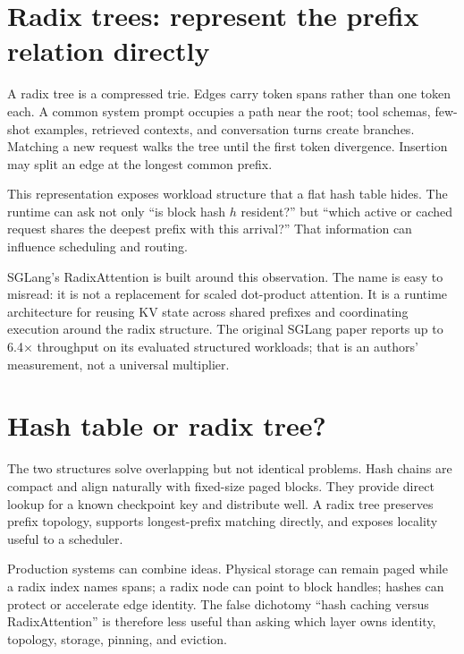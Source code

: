 
\section{Radix trees: represent the prefix relation directly}

A radix tree is a compressed trie. Edges carry token spans rather than one token each.
A common system prompt occupies a path near the root; tool schemas, few-shot examples,
retrieved contexts, and conversation turns create branches. Matching a new request
walks the tree until the first token divergence. Insertion may split an edge at the
longest common prefix.

This representation exposes workload structure that a flat hash table hides. The
runtime can ask not only ``is block hash $h$ resident?'' but ``which active or cached
request shares the deepest prefix with this arrival?'' That information can influence
scheduling and routing.

SGLang's RadixAttention is built around this observation. The name is easy to
misread: it is not a replacement for scaled dot-product attention. It is a runtime
architecture for reusing KV state across shared prefixes and coordinating execution
around the radix structure. The original SGLang paper reports up to 6.4$\times$
throughput on its evaluated structured workloads; that is an authors' measurement,
not a universal multiplier.


\section{Hash table or radix tree?}

The two structures solve overlapping but not identical problems. Hash chains are
compact and align naturally with fixed-size paged blocks. They provide direct lookup
for a known checkpoint key and distribute well. A radix tree preserves prefix
topology, supports longest-prefix matching directly, and exposes locality useful to a
scheduler.

Production systems can combine ideas. Physical storage can remain paged while a radix
index names spans; a radix node can point to block handles; hashes can protect or
accelerate edge identity. The false dichotomy ``hash caching versus RadixAttention''
is therefore less useful than asking which layer owns identity, topology, storage,
pinning, and eviction.

